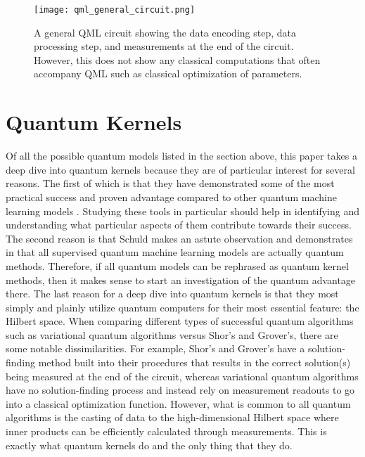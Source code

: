\documentclass[
	a4paper, %
	10pt, %
	unnumberedsections, %
	twoside, %
]{LTJournalArticle}
\begin{document}
\begin{figure} %
	\texttt{[image: qml\_general\_circuit.png]}
	\caption{A general QML circuit showing the data encoding step, data processing step, and measurements at the end of the circuit. However, this does not show any classical computations that
	often accompany QML such as classical optimization of parameters.}
	\label{fig:qmlgencircuit}
\end{figure}

\section{Quantum Kernels}
Of all the possible quantum models listed in the section above, this paper takes a deep dive into quantum kernels because they are of particular interest for several reasons. The first of which 
is that they have demonstrated some of the most practical success and proven advantage compared to other quantum machine learning models \autocite{liu2021rigorous}. Studying these tools in 
particular should help in identifying and understanding what particular aspects of them contribute towards their success. The second reason is that Schuld makes an astute observation and 
demonstrates in \autocite{schuld2021supervised} that all supervised quantum machine learning models are actually quantum methods. Therefore, if all quantum models can be rephrased as quantum kernel methods, 
then it makes sense to start an investigation of the quantum advantage there. The last reason for a deep dive into quantum kernels is that they most simply and plainly utilize quantum computers 
for their most essential feature: the Hilbert space. When comparing different types of successful quantum algorithms such as variational quantum algorithms versus Shor's and Grover's, there are 
some notable dissimilarities. For example, Shor's and Grover's have a solution-finding method built into their procedures that results in the correct solution(s) being measured at the end of 
the circuit, whereas variational quantum algorithms have no solution-finding process and instead rely on measurement readouts to go into a classical optimization function. However, what is 
common to all quantum algorithms is the casting of data to the high-dimensional Hilbert space where inner products can be efficiently calculated through measurements. This is exactly what 
quantum kernels do and the only thing that they do.
\end{document}
